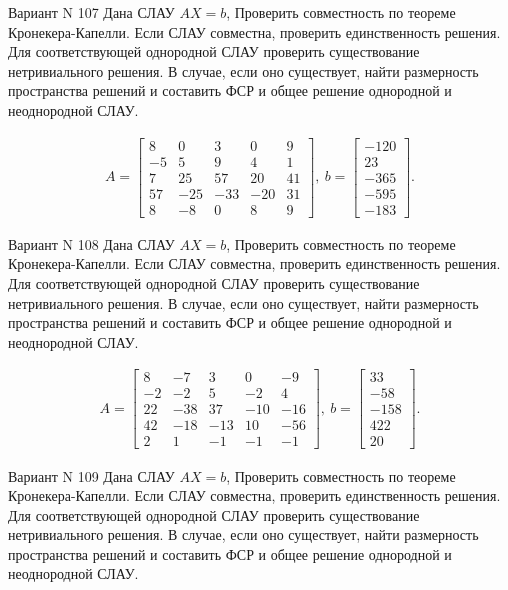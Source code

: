 \documentclass[11pt]{report}
\begin{document}
Вариант N 107
Дана СЛАУ $AX = b$,
Проверить совместность по теореме Кронекера-Капелли. Если СЛАУ совместна, проверить единственность решения.
Для соответствующей однородной СЛАУ проверить существование нетривиального решения. В случае, если оно существует,
найти размерность пространства решений и составить ФСР и общее решение однородной  и неоднородной СЛАУ.


\begin{align*}
 A = \left[\begin{matrix}8 & 0 & 3 & 0 & 9\\-5 & 5 & 9 & 4 & 1\\7 & 25 & 57 & 20 & 41\\57 & -25 & -33 & -20 & 31\\8 & -8 & 0 & 8 & 9\end{matrix}\right],
\ b = \left[\begin{matrix}-120\\23\\-365\\-595\\-183\end{matrix}\right]. 
 \end{align*}

Вариант N 108
Дана СЛАУ $AX = b$,
Проверить совместность по теореме Кронекера-Капелли. Если СЛАУ совместна, проверить единственность решения.
Для соответствующей однородной СЛАУ проверить существование нетривиального решения. В случае, если оно существует,
найти размерность пространства решений и составить ФСР и общее решение однородной  и неоднородной СЛАУ.


\begin{align*}
 A = \left[\begin{matrix}8 & -7 & 3 & 0 & -9\\-2 & -2 & 5 & -2 & 4\\22 & -38 & 37 & -10 & -16\\42 & -18 & -13 & 10 & -56\\2 & 1 & -1 & -1 & -1\end{matrix}\right],
\ b = \left[\begin{matrix}33\\-58\\-158\\422\\20\end{matrix}\right]. 
 \end{align*}

Вариант N 109
Дана СЛАУ $AX = b$,
Проверить совместность по теореме Кронекера-Капелли. Если СЛАУ совместна, проверить единственность решения.
Для соответствующей однородной СЛАУ проверить существование нетривиального решения. В случае, если оно существует,
найти размерность пространства решений и составить ФСР и общее решение однородной  и неоднородной СЛАУ.
\end{document}
